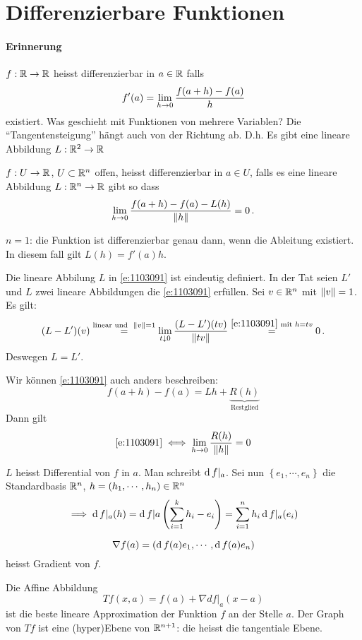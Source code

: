 \section{Differenzierbare Funktionen}
\paragraph{Erinnerung} $f:\mathbb{R}\rightarrow \mathbb{R}$ heisst differenzierbar in $a\in \mathbb{R}$ falls
\[f'(a)=\displaystyle\lim_{h\rightarrow0}\frac{f(a+h)-f(a)}{h}\]
existiert. Was geschieht mit Funktionen von mehrere Variablen? Die ``Tangentensteigung'' hängt auch von der Richtung ab. D.h. Es gibt eine lineare Abbildung $L:\mathbb{R}^2\rightarrow\mathbb{R}$
\begin{Def}
  $f:U\rightarrow\mathbb{R}$, $U\subset\mathbb{R}^n$ offen, heisst differenzierbar in $a\in U$, falls
  es eine lineare Abbildung $L:\mathbb{R}^n\rightarrow\mathbb{R}$ gibt so dass
\begin{equation}
    \label{e:1103091}
    \displaystyle\lim_{h\rightarrow0}\frac{f(a+h)-f(a)-L (h)}{\left\| h \right\|}=0\, .
  \end{equation}
\end{Def}
\begin{Bem}
  $n=1$: die Funktion ist differenzierbar genau dann, wenn die Ableitung existiert.
In diesem fall gilt $L (h) = f'(a)h$.
\end{Bem}
\begin{Bem}
  Die lineare Abbilung $L$ in \eqref{e:1103091} ist eindeutig definiert. In der Tat seien $L'$ und $L$ 
zwei lineare Abbildungen die \eqref{e:1103091} erfüllen. Sei $v\in\mathbb{R}^n$ mit $\left\| v \right\|=1$. Es gilt:
  \[(L-L')(v)\stackrel{\text{linear und}\hspace{2mm} \left\| v \right\|=1}{=}\lim_{t\downarrow 0}\frac{(L-L')(tv)}{\left\| tv \right\|}\stackrel{\eqref{e:1103091}\text{ mit }h=tv}{=} 0\, .\] 
Deswegen $L=L'$.
\end{Bem}
\begin{Bem}
  Wir können \eqref{e:1103091} auch anders beschreiben:
  \[f(a+h)-f(a)=Lh+\underbrace{R(h)}_{\text{Restglied}}\]
  Dann gilt
  \begin{equation}
    \label{e:1103092}
    \eqref{e:1103091} \iff \displaystyle\lim_{h\rightarrow0}\frac{R(h)}{\left\| h \right\|}=0
  \end{equation}
\end{Bem}
\begin{Def}
  $L$ heisst Differential von $f$ in $a$. Man schreibt $\operatorname{d} f|_a$. Sei nun $\left\{ e_1,\cdots,e_n \right\}$ die Standardbasis $\mathbb{R}^n$, $h=(h_1,\cdots,h_n)\in\mathbb{R}^n$
  \[\implies \operatorname{d} f|_a (h)=\operatorname{d} f|a \left( \sum_{i=1}^kh_i-e_i \right)=\sum_{i=1}^nh_i\operatorname{d} f|_a (e_i)\]
\end{Def}
\begin{Def}
  \[\nabla f (a)=(\operatorname{d} f(a)e_1,\cdots,\operatorname{d} f(a)e_n)\]
  heisst Gradient von $f$.
\end{Def}
Die Affine Abbildung 
  \[Tf(x,a)=f(a)+\nabla df|_a (x-a)\]
ist die beste lineare Approximation der Funktion $f$ an der Stelle $a$. Der Graph von 
$Tf$ ist eine (hyper)Ebene von $\mathbb{R}^{n+1}$: die heisst die tangentiale Ebene.

